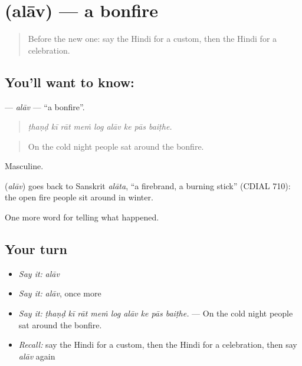 \section[\texorpdfstring{\hi{अलाव} (alāv)}{अलाव (alāv)}]{ (alāv) — a bonfire}

\label{lesson:HI-C332-alav}



\begin{quote}
Before the new one: say the Hindi for a custom, then the Hindi for a celebration.
\end{quote}

\subsection*{You'll want to know: }
\textbf{} — \emph{alāv} — \textquotedblleft{}a bonfire\textquotedblright{}.

\begin{quote}
        
\end{quote}

\begin{quote}
\emph{ṭhaṇḍ kī rāt meṁ log alāv ke pās baiṭhe.}
\end{quote}

\begin{quote}
On the cold night people sat around the bonfire.
\end{quote}

Masculine.

\begin{cousinweb}
\textbf{} (\emph{alāv}) goes back to Sanskrit \emph{alāta}, \textquotedblleft{}a firebrand, a burning stick\textquotedblright{} (CDIAL 710): the open fire people sit around in winter.
\end{cousinweb}

\begin{grammarlens}[title={What you've built}]
One more word for telling what happened.
\end{grammarlens}

\subsection*{Your turn}
\begin{itemize}
\raggedright
  \item \emph{Say it:} \emph{alāv}
  \item \emph{Say it:} \emph{alāv}, once more
  \item \emph{Say it:} \emph{ṭhaṇḍ kī rāt meṁ log alāv ke pās baiṭhe.} — On the cold night people sat around the bonfire.
  \item \emph{Recall:} say the Hindi for a custom, then the Hindi for a celebration, then say \emph{alāv} again
\end{itemize}

